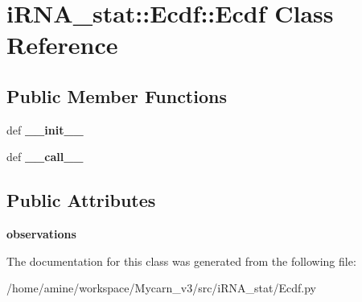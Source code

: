 \hypertarget{classiRNA__stat_1_1Ecdf_1_1Ecdf}{
\section{i\-R\-N\-A\-\_\-stat\-:\-:\-Ecdf\-:\-:\-Ecdf \-Class \-Reference}
\label{classiRNA__stat_1_1Ecdf_1_1Ecdf}
}
\subsection*{\-Public \-Member \-Functions}
\begin{DoxyCompactItemize}
\item 
\hypertarget{classiRNA__stat_1_1Ecdf_1_1Ecdf_a8639269a23ee97bcf369837979dc698f}{
def {\bfseries \-\_\-\-\_\-init\-\_\-\-\_\-}}
\label{classiRNA__stat_1_1Ecdf_1_1Ecdf_a8639269a23ee97bcf369837979dc698f}

\item 
\hypertarget{classiRNA__stat_1_1Ecdf_1_1Ecdf_a6431ec5f59ada0c97b97b9cd8908562d}{
def {\bfseries \-\_\-\-\_\-call\-\_\-\-\_\-}}
\label{classiRNA__stat_1_1Ecdf_1_1Ecdf_a6431ec5f59ada0c97b97b9cd8908562d}

\end{DoxyCompactItemize}
\subsection*{\-Public \-Attributes}
\begin{DoxyCompactItemize}
\item 
\hypertarget{classiRNA__stat_1_1Ecdf_1_1Ecdf_abeb7b3d39468ba8c936e13dd9d164b86}{
{\bfseries observations}}
\label{classiRNA__stat_1_1Ecdf_1_1Ecdf_abeb7b3d39468ba8c936e13dd9d164b86}

\end{DoxyCompactItemize}


\-The documentation for this class was generated from the following file\-:\begin{DoxyCompactItemize}
\item 
/home/amine/workspace/\-Mycarn\-\_\-v3/src/i\-R\-N\-A\-\_\-stat/\-Ecdf.\-py\end{DoxyCompactItemize}
